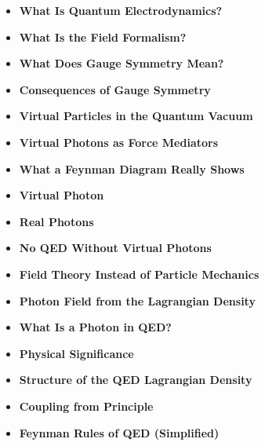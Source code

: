\vspace{1em}
\begin{tcolorbox}[title=Physical Boxes, physikbox]
	\begin{itemize}
		\item \textbf{What Is Quantum Electrodynamics?} \dotfill \pageref{box:was ist quantenelektro}
		\item \textbf{What Is the Field Formalism?} \dotfill \pageref{box:was ist Feldformalismus}
		\item \textbf{What Does Gauge Symmetry Mean?} \dotfill \pageref{box:was bedeutet Eichsy}
		\item \textbf{Consequences of Gauge Symmetry} \dotfill \pageref{box:folgen der Eichsy}
		\item \textbf{Virtual Particles in the Quantum Vacuum} \dotfill \pageref{box:virtuelle-teilchen}
		\item \textbf{Virtual Photons as Force Mediators} \dotfill \pageref{box:Virtuelle Photonen als kraftvermittler}
		\item \textbf{What a Feynman Diagram Really Shows} \dotfill \pageref{box:Was ein Feynman-Diagramm}
		\item \textbf{Virtual Photon} \dotfill \pageref{box:virtuelles Photon}
		\item \textbf{Real Photons} \dotfill \pageref{box:Reale Photonen}
		\item \textbf{No QED Without Virtual Photons} \dotfill \pageref{box:Ohne virtuelle Photonen keine}
		\item \textbf{Field Theory Instead of Particle Mechanics} \dotfill \pageref{box:Feldtheorie statt Teilchenmechanik}
		\item \textbf{Photon Field from the Lagrangian Density} \dotfill \pageref{box:Photonenfeld aus der Lagrangedichte}
		\item \textbf{What Is a Photon in QED?} \dotfill \pageref{box:Warum ist ein Photon in der QED}
		\item \textbf{Physical Significance} \dotfill \pageref{box:physikalische Bedeutung}
	\end{itemize}
\end{tcolorbox}

\vspace{1em}
\begin{tcolorbox}[title=Mathematical Boxes, mathebox]
	\begin{itemize}
		\item \textbf{Structure of the QED Lagrangian Density} \dotfill \pageref{box:Sufbau der QED-Langrangedichte}
		\item \textbf{Coupling from Principle} \dotfill \pageref{box:Kopplung aus Prinzip}
		\item \textbf{Feynman Rules of QED (Simplified)} \dotfill \pageref{box:Feynman-Regeln der QED}
	\end{itemize}
\end{tcolorbox}

